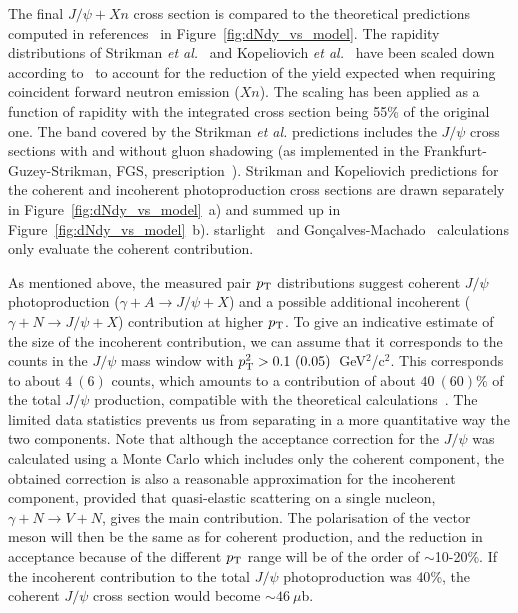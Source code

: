 \documentclass[dvipdfm]{elsart}
\def\fig#1{{Figure~\ref{#1}}}
\providecommand{\jpsi}{J/\psi}
\begin{document}
The final $\jpsi +Xn$ cross section is compared to the theoretical 
predictions computed in 
references~\cite{Baltz:2002pp,Strikman:2005ze,Klein:1999qj,Ivanov:2007ms,Nystrand:2004vn,Goncalves:2007qu} 
in \fig{fig:dNdy_vs_model}. The rapidity distributions of Strikman {\it et 
al.}~\cite{Strikman:2005ze} and Kopeliovich {\it et al.}~\cite{Ivanov:2007ms} 
have been scaled down according to~\cite{Baltz:2002pp} to account for the 
reduction of the yield expected when requiring coincident forward neutron 
emission ($Xn$). The scaling has been applied as a function of rapidity with 
the integrated cross section being 55\% of the original one. The band covered 
by the Strikman {\it et al.} predictions includes the $\jpsi$ cross sections 
with and without gluon shadowing (as implemented in the 
Frankfurt-Guzey-Strikman, FGS, prescription~\cite{Frankfurt:2003zd}). 
Strikman and Kopeliovich predictions for the coherent and incoherent 
photoproduction cross sections are drawn separately in 
\fig{fig:dNdy_vs_model}~a) and summed up in \fig{fig:dNdy_vs_model}~b). {\sc 
starlight}~\cite{Nystrand:2004vn} and 
Gon\c{c}alves-Machado~\cite{Goncalves:2007qu} calculations only evaluate the 
coherent contribution.

As mentioned above, the measured pair $p_{\rm T}$ distributions suggest coherent 
$\jpsi$ photoproduction ($\gamma + A \rightarrow \jpsi +X$) and a possible 
additional incoherent ($\gamma + N \rightarrow \jpsi + X$) contribution at 
higher $p_{\rm T}$. To give an indicative estimate of the size of the incoherent 
contribution, we can assume that it corresponds to the counts in the $\jpsi$ 
mass window with $p_{\rm T}^2 > 0.1~(0.05)$~GeV$^2$/c$^2$. This corresponds to 
about $4~(6)$ counts, which amounts to a contribution of about $40~(60)\%$ of 
the total $\jpsi$ production, compatible with the theoretical 
calculations~\cite{Strikman:2005ze}. The limited data statistics prevents us 
from separating in a more quantitative way the two components. Note that 
although the acceptance correction for the $\jpsi$ was calculated using a 
Monte Carlo which includes only the coherent component, the obtained 
correction is also a reasonable approximation for the incoherent component, 
provided that quasi-elastic scattering on a single nucleon, $\gamma + N 
\rightarrow V + N$, gives the main contribution. The polarisation of the 
vector meson will then be the same as for coherent production, and the 
reduction in acceptance because of the different $p_{\rm T}$ range will be of the 
order of $\sim$10-20\%. If the incoherent contribution to the total $\jpsi$ 
photoproduction was $40$\%, the coherent $\jpsi$ cross section would become 
$\sim 46~\mu$b.
\end{document}

